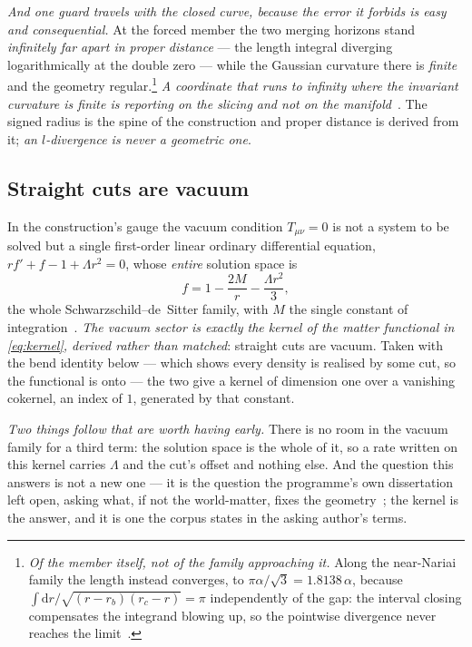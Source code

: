 \documentclass[11pt,a4paper]{article}
\newcommand{\dd}{\mathrm{d}}
\theoremstyle{plain}
\theoremstyle{definition}
\begin{document}
\emph{And one guard travels with the closed curve, because the error it forbids is easy and consequential.}
At the forced member the two merging horizons stand \emph{infinitely far apart in proper distance} --- the
length integral diverging logarithmically at the double zero --- while the Gaussian curvature there is
\emph{finite} and the geometry regular.\footnote{\emph{Of the member itself, not of the family approaching it.} Along the near-Nariai family the length instead converges, to $\pi\alpha/\sqrt3=1.8138\,\alpha$, because $\int\dd r/\sqrt{(r-r_b)(r_c-r)}=\pi$ independently of the gap: the interval closing compensates the integrand blowing up, so the pointwise divergence never reaches the limit~\cite{JanzenMatter}.} \emph{A coordinate that runs to infinity where the invariant
curvature is finite is reporting on the slicing and not on the
manifold}~\cite{JanzenSlicing}. The signed radius is the spine of the construction and proper distance is
derived from it; \emph{an $l$-divergence is never a geometric one}.

\subsection{Straight cuts are vacuum}

In the construction's gauge the vacuum condition $T_{\mu\nu}=0$ is not a system to be solved but a single
first-order linear ordinary differential equation, $rf'+f-1+\Lambda r^{2}=0$, whose \emph{entire} solution
space is
\begin{equation}
f = 1-\frac{2M}{r}-\frac{\Lambda r^{2}}{3},
\label{eq:kernel}
\end{equation}
the whole Schwarzschild--de~Sitter family, with $M$ the single constant of
integration~\cite{JanzenOperator}. \emph{The vacuum sector is exactly the kernel of the matter functional in
\eqref{eq:kernel}, derived rather than matched}: straight cuts are vacuum. Taken with the bend identity below --- which shows
every density is realised by some cut, so the functional is onto --- the two give a kernel of dimension one
over a vanishing cokernel, an index of $1$, generated by that constant.

\emph{Two things follow that are worth having early.} There is no room in the vacuum family for a third
term: the solution space is the whole of it, so a rate written on this kernel carries $\Lambda$ and the
cut's offset and nothing else. And the question this answers is not a new one --- it is the question the
programme's own dissertation left open, asking what, if not the world-matter, fixes the
geometry~\cite{JanzenThesis}; the kernel is the answer, and it is one the corpus states in the asking
author's terms.
\end{document}

